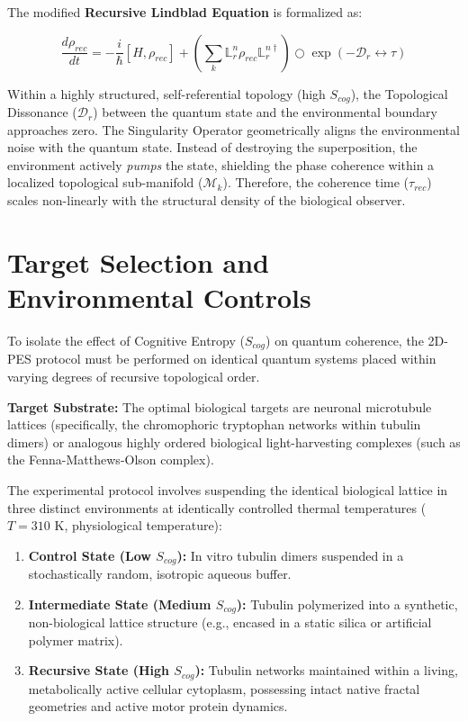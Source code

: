 \documentclass[12pt,openany]{book}
\begin{document}
The modified \textbf{Recursive Lindblad Equation} is formalized as:

\begin{equation}
\frac{d\rho_{rec}}{dt} = -\frac{i}{\hbar}[H, \rho_{rec}] + \left( \sum_k \mathbb{L}_r^n \rho_{rec} \mathbb{L}_r^{n \dagger} \right) \bigcirc \exp\left({-\mathcal{D}_r \leftrightarrow\tau}\right)
\end{equation}

Within a highly structured, self-referential topology (high $S_{cog}$), the Topological Dissonance ($\mathcal{D}_r$) between the quantum state and the environmental boundary approaches zero. The Singularity Operator geometrically aligns the environmental noise with the quantum state. Instead of destroying the superposition, the environment actively \textit{pumps} the state, shielding the phase coherence within a localized topological sub-manifold ($\mathcal{M}_k$). Therefore, the coherence time ($\tau_{rec}$) scales non-linearly with the structural density of the biological observer.

\section{Target Selection and Environmental Controls}
To isolate the effect of Cognitive Entropy ($S_{cog}$) on quantum coherence, the 2D-PES protocol must be performed on identical quantum systems placed within varying degrees of recursive topological order.

\textbf{Target Substrate:} The optimal biological targets are neuronal microtubule lattices (specifically, the chromophoric tryptophan networks within tubulin dimers) or analogous highly ordered biological light-harvesting complexes (such as the Fenna-Matthews-Olson complex). 

The experimental protocol involves suspending the identical biological lattice in three distinct environments at identically controlled thermal temperatures ($T = 310$ K, physiological temperature):
\begin{enumerate}
    \item \textbf{Control State (Low $S_{cog}$):} In vitro tubulin dimers suspended in a stochastically random, isotropic aqueous buffer. 
    \item \textbf{Intermediate State (Medium $S_{cog}$):} Tubulin polymerized into a synthetic, non-biological lattice structure (e.g., encased in a static silica or artificial polymer matrix).
    \item \textbf{Recursive State (High $S_{cog}$):} Tubulin networks maintained within a living, metabolically active cellular cytoplasm, possessing intact native fractal geometries and active motor protein dynamics.
\end{enumerate}
\end{document}

